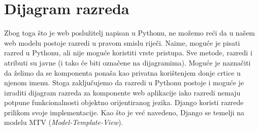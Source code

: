 			
		\section{Dijagram razreda}

			
			Zbog toga što je web poslužitelj napisan u Pythonu, ne možemo reći da u našem web modelu postoje razredi u pravom smislu riječi. Naime, moguće je pisati razred u Pythonu, ali nije moguće koristiti vrste pristupa. Sve metode, razredi i atributi su javne (i tako će biti označene na dijagramima). Moguće je naznačiti da želimo da se komponenta ponaša kao privatna korištenjem donje crtice u njenom imenu. Stoga zaključujemo da razredi u Pythonu postoje i moguće je izraditi dijagram razreda za komponente web aplikacije iako razredi nemaju potpune funkcionalnosti objektno orijentiranog jezika. Django koristi razrede prilikom svoje implementacije. Kao što je već navedeno, Django se temelji na modelu MTV (\emph{Model-Template-View}).\\\
			
